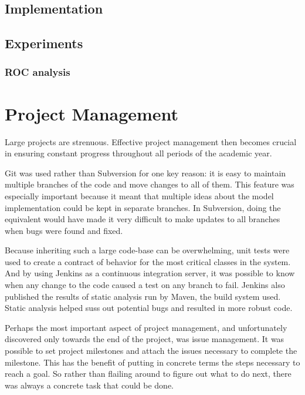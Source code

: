 \documentclass[11pt, a4paper]{report}
\begin{document}
\section{Implementation}
\section{Experiments}
\subsection{ROC analysis}

\chapter{Project Management}
\label{cha:project-management}
Large projects are strenuous. Effective project management then
becomes crucial in ensuring constant progress throughout all periods
of the academic year.

Git was used rather than Subversion for one key reason: it is easy to
maintain multiple branches of the code and move changes to all of
them. This feature was especially important because it meant that
multiple ideas about the model implementation could be kept in
separate branches. In Subversion, doing the equivalent would have made
it very difficult to make updates to all branches when bugs were found
and fixed.

Because inheriting such a large code-base can be overwhelming, unit
tests were used to create a contract of behavior for the most critical
classes in the system. And by using Jenkins as a continuous
integration server, it was possible to know when any change to the
code caused a test on any branch to fail. Jenkins also published the
results of static analysis run by Maven, the build system used. Static
analysis helped suss out potential bugs and resulted in more robust code.

Perhaps the most important aspect of project management, and
unfortunately discovered only towards the end of the project, was
issue management. It was possible to set project milestones and attach
the issues necessary to complete the milestone. This has the benefit
of putting in concrete terms the steps necessary to reach a goal. So
rather than flailing around to figure out what to do next, there was
always a concrete task that could be done.
\end{document}
